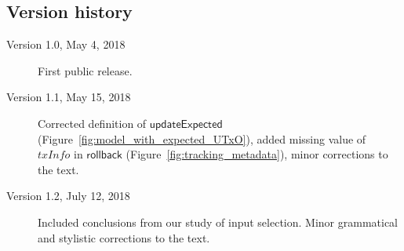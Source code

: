 \documentclass{article}
\theoremstyle{definition}{
  \newtheorem{lemma}{Lemma}[section] %
  \newtheorem{definition}[lemma]{Definition}
}
\theoremstyle{theorem}{
  \newtheorem{invariant}[lemma]{Invariant}
  \newtheorem{proofobligation}[lemma]{Proof Obligation}
}
\numberwithin{equation}{lemma}
\begin{document}
\subsection{Version history}

\begin{description}
\item[Version 1.0, May 4, 2018] First public release.

\item[Version 1.1, May 15, 2018] Corrected definition of
$\mathsf{updateExpected}$ (Figure~\ref{fig:model_with_expected_UTxO}), added
missing value of $\mathit{txInfo}$ in $\mathsf{rollback}$
(Figure~\ref{fig:tracking_metadata}), minor corrections to the text.

\item[Version 1.2, July 12, 2018] Included conclusions from our study of
input selection. Minor grammatical and stylistic corrections to the text.
\end{description}

\pagebreak
\tableofcontents
\listoffigures
\pagebreak
\end{document}
